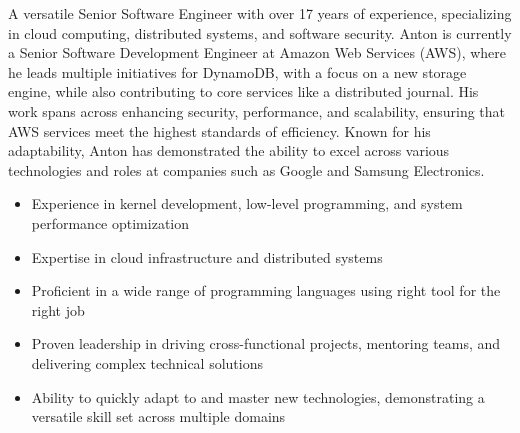 



A versatile Senior Software Engineer with over 17 years of experience, specializing in cloud computing, distributed systems, and software security. Anton is currently a Senior Software Development Engineer at Amazon Web Services (AWS), where he leads multiple initiatives for DynamoDB, with a focus on a new storage engine, while also contributing to core services like a distributed journal. His work spans across enhancing security, performance, and scalability, ensuring that AWS services meet the highest standards of efficiency. Known for his adaptability, Anton has demonstrated the ability to excel across various technologies and roles at companies such as Google and Samsung Electronics.

\begin{cvparagraph}
\begin{itemize}
  \item Experience in kernel development, low-level programming, and system performance optimization
  \item Expertise in cloud infrastructure and distributed systems
  \item Proficient in a wide range of programming languages using right tool for the right job
  \item Proven leadership in driving cross-functional projects, mentoring teams, and delivering complex technical solutions
  \item Ability to quickly adapt to and master new technologies, demonstrating a versatile skill set across multiple domains
\end{itemize}

\end{cvparagraph}
